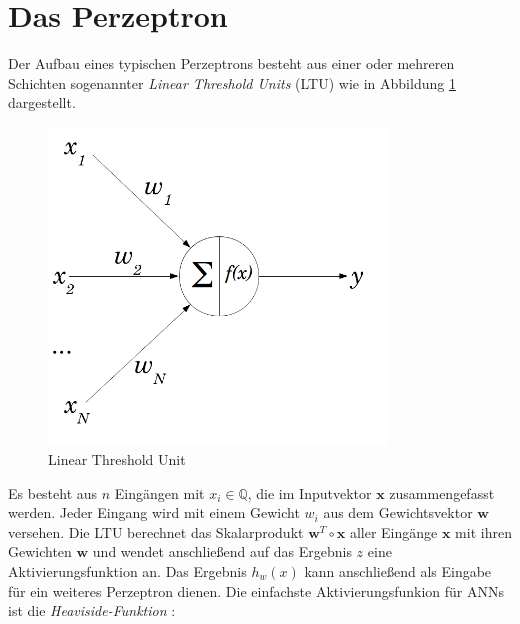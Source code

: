 \section*{Das Perzeptron}

Der Aufbau eines typischen Perzeptrons besteht aus einer oder mehreren Schichten sogenannter \textit{Linear Threshold Units} (LTU) wie in Abbildung \ref{ltu} dargestellt.

\begin{figure}[H]
	\begin{center}
		\includegraphics[width=9cm]{Bilder/perceptron.png} 
		\caption[Linear Threshold Unit]{Linear Threshold Unit \cite{AurelienGeron.2018}}
		\label{ltu}
	\end{center}
\end{figure}

Es besteht aus $n$ Eingängen mit $x_{i} \in \mathbb{Q}$, die im Inputvektor $\boldsymbol{x}$ zusammengefasst werden. Jeder Eingang wird mit einem Gewicht $w_{i}$ aus dem Gewichtsvektor $\boldsymbol{w}$ versehen. Die LTU berechnet das Skalarprodukt $\boldsymbol{w}^{T} \circ \boldsymbol{x}$ aller Eingänge $\boldsymbol{x}$ mit ihren Gewichten $\boldsymbol{w}$ und wendet anschließend auf das Ergebnis $z$ eine Aktivierungsfunktion an. Das Ergebnis $h_{w}(x)$ kann anschließend als Eingabe für ein weiteres Perzeptron dienen. Die einfachste Aktivierungsfunkion für ANNs ist die \textit{Heaviside-Funktion} \cite{AurelienGeron.2018}: 

